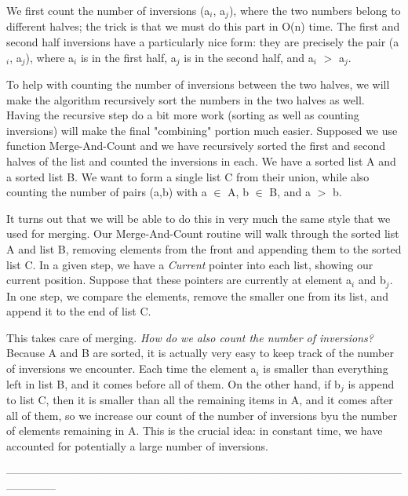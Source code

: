 \documentclass{article}
\begin{document}
We first count the number of inversions (a$_i$, a$_j$), where the two numbers belong to different halves; the trick is that we must do this part in O(n) time. The first and second half inversions have a particularly nice form: they are precisely the pair (a$_i$, a$_j$), where a$_i$ is in the first half, a$_j$ is in the second half, and a$_i$ $>$ a$_j$.

\medskip

To help with counting the number of inversions between the two halves, we will make the algorithm recursively sort the numbers in the two halves as well. Having the recursive step do a bit more work (sorting as well as counting inversions) will make the final "combining" portion much easier. Supposed we use function Merge-And-Count and we have recursively sorted the first and second halves of the list and counted the inversions in each. We have a sorted list A and a sorted list B. We want to form a single list C from their union, while also counting the number of pairs (a,b) with a $\in$ A, b $\in$ B, and a $>$ b.

\medskip

It turns out that we will be able to do this in very much the same style that we used for merging. Our Merge-And-Count routine will walk through the sorted list A and list B, removing elements from the front and appending them to the sorted list C. In a given step, we have a \emph{Current} pointer into each list, showing our current position. Suppose that these pointers are currently at element a$_i$ and b$_j$. In one step, we compare the elements, remove the smaller one from its list, and append it to the end of list C.

\medskip

This takes care of merging. \emph{How do we also count the number of inversions?} Because A and B are sorted, it is actually very easy to keep track of the number of inversions we encounter. Each time the element a$_i$ is smaller than everything left in list B, and it comes before all of them. On the other hand, if b$_j$ is append to list C, then it is smaller than all the remaining items in A, and it comes after all of them, so we increase our count of the number of inversions byu the number of elements remaining in A. This is the crucial idea: in constant time, we have accounted for potentially a large number of inversions.\\

\medskip

--------------------------------------------------------------------------------------------------------------------------
\medskip
\end{document}
